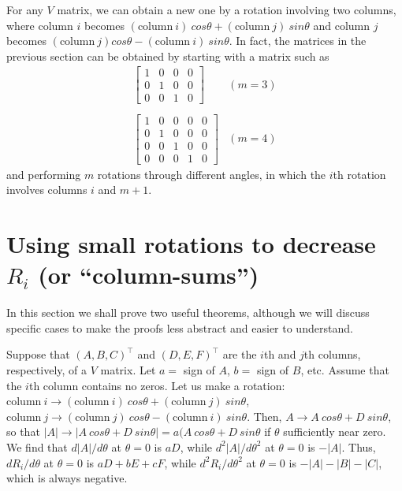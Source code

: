 For any $V$ matrix, we can obtain a new one by a rotation involving two
columns, where column $i$ becomes $(\text{column}~i)\allowbreak~cos\theta +
(\text{column}~j)\allowbreak~sin\theta$ and column $j$ becomes $(\text{column}~j)
cos\theta - (\text{column}~i)\allowbreak~sin\theta$.  In fact, the matrices in
the previous section can be obtained by starting with a matrix such as
\begin{equation*}
\begin{array}{cc}

\begin{bmatrix}
1 & 0 & 0 & 0 \\
0 & 1 & 0 & 0 \\
0 & 0 & 1 & 0
\end{bmatrix}
& (m = 3) \\

& \\

\begin{bmatrix}
1 & 0 & 0 & 0 & 0 \\
0 & 1 & 0 & 0 & 0 \\
0 & 0 & 1 & 0 & 0 \\
0 & 0 & 0 & 1 & 0
\end{bmatrix}
& (m = 4)

\end{array}
\end{equation*}
and performing $m$ rotations through different angles, in which the $i$th
rotation involves columns $i$ and $m+1$.

\section*{Using small rotations to decrease $R_i$ (or ``column-sums'')}

In this section we shall prove two useful theorems, although we will discuss
specific cases to make the proofs less abstract and easier to understand.

Suppose that $(A, B, C)^\top$ and $(D, E, F)^\top$ are the $i$th and $j$th columns,
respectively, of a $V$ matrix.  Let $a =$ sign of $A$, $b =$ sign of $B$, etc.
Assume that the $i$th column contains no zeros.  Let us make a rotation:
$\text{column}~i \rightarrow (\text{column}~i)\allowbreak~cos\theta +
(\text{column}~j)\allowbreak~sin\theta$, $\text{column}~j \rightarrow
(\text{column}~j)\allowbreak~cos\theta - (\text{column}~i)\allowbreak~sin\theta$. Then,
$A \rightarrow A~cos\theta + D~sin\theta$, so that $|A| \rightarrow | A~
cos\theta + D~sin\theta | = a (A~cos\theta + D~sin\theta$ if $\theta$
sufficiently near zero.  We find that $d|A|/d\theta$ at $\theta = 0$ is $aD$,
while $d^2|A|/d\theta^2$ at $\theta = 0$ is $-|A|$.  Thus, $dR_i/d\theta$ at
$\theta = 0$ is $a D + b E + c F$, while $d^2R_i/d\theta^2$ at $\theta = 0$ is
$-|A|-|B|-|C|$, which is always negative.

